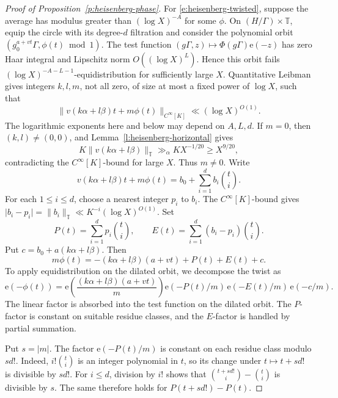 \documentclass[12pt]{amsart}
\newcommand{\1}{\mathbf 1}
\newcommand{\e}{\mathrm e}
\theoremstyle{definition}
\begin{document}
\begin{proof}[Proof of Proposition~\ref{p:heisenberg-phase}]
For \eqref{e:heisenberg-twisted}, suppose the average has modulus
greater than \((\log X)^{-A}\) for some \(\phi\). On
\((H/\Gamma)\times\mathbb T\), equip the circle with its degree-\(d\)
filtration and consider the polynomial orbit
\((g_0^{a+vt}\Gamma,\phi(t)\bmod 1)\). The test function
\((g\Gamma,z)\mapsto\Phi(g\Gamma)\e(-z)\) has zero Haar integral
and Lipschitz norm \(O((\log X)^L)\). Hence this orbit fails
\((\log X)^{-A-L-1}\)-equidistribution for sufficiently large \(X\).
Quantitative Leibman gives integers \(k,l,m\), not all zero,
of size at most a fixed power of \(\log X\), such that
\[
 \|v(k\alpha+l\beta)t+m\phi(t)\|_{C^\infty[K]}
 \ll(\log X)^{O(1)}.
\]
The logarithmic exponents here and below may depend on \(A,L,d\).
If \(m=0\), then \((k,l)\ne(0,0)\), and
Lemma~\ref{l:heisenberg-horizontal} gives
\[
 K\|v(k\alpha+l\beta)\|_{\mathbb T}
 \gg_\alpha KX^{-1/20}\geq X^{9/20},
\]
contradicting the \(C^\infty[K]\)-bound for large \(X\).
Thus \(m\ne0\).
Write
\[
 v(k\alpha+l\beta)t+m\phi(t)
 =b_0+\sum_{i=1}^d b_i\binom{t}{i}.
\]
For each \(1\leq i\leq d\), choose a nearest integer \(p_i\) to
\(b_i\). The \(C^\infty[K]\)-bound gives
\(\lvert b_i-p_i\rvert=\|b_i\|_{\mathbb T}
\ll K^{-i}(\log X)^{O(1)}\). Set
\[
 P(t)=\sum_{i=1}^d p_i\binom{t}{i},
 \qquad
 E(t)=\sum_{i=1}^d(b_i-p_i)\binom{t}{i}.
\]
Put $c=b_0+a(k\alpha+l\beta)$. Then
\[
 m\phi(t)=-(k\alpha+l\beta)(a+vt)+P(t)+E(t)+c.
\]
To apply equidistribution on the dilated orbit, we decompose the
twist as
\[
 \e(-\phi(t))
 =\e\!\left(\frac{(k\alpha+l\beta)(a+vt)}{m}\right)
  \e(-P(t)/m)\,\e(-E(t)/m)\,\e(-c/m).
\]
The linear factor is absorbed into the test function on the
dilated orbit. The \(P\)-factor is constant on suitable residue
classes, and the \(E\)-factor is handled by partial summation. 

Put \(s=|m|\). The factor \(\e(-P(t)/m)\) is constant on each
residue class modulo \(sd!\). Indeed, \(i!\binom{t}{i}\) is an
integer polynomial in \(t\), so its change under \(t\mapsto t+sd!\)
is divisible by \(sd!\). For \(i\leq d\), division by \(i!\) shows
that \(\binom{t+sd!}{i}-\binom{t}{i}\) is divisible by \(s\).
The same therefore holds for \(P(t+sd!)-P(t)\).


\end{proof}
\end{document}
